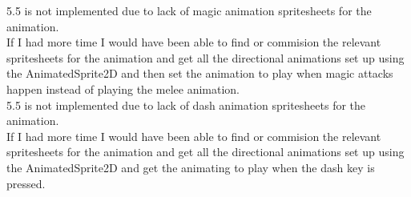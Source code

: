 \documentclass{article}
\begin{document}
        5.5 is not implemented due to lack of magic animation spritesheets for the animation.\\
        If I had more time I would have been able to find or commision the relevant spritesheets for the animation and get all the directional animations set up using the AnimatedSprite2D and then set the animation to play when magic attacks happen instead of playing the melee animation.\\
        5.5 is not implemented due to lack of dash animation spritesheets for the animation.\\
        If I had more time I would have been able to find or commision the relevant spritesheets for the animation and get all the directional animations set up using the AnimatedSprite2D and get the animating to play when the dash key is pressed.\\
\end{document}
